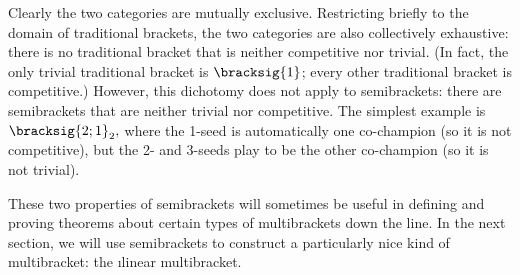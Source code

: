 {    Clearly the two categories are mutually exclusive. Restricting briefly to the domain of traditional brackets, the two categories are also collectively exhaustive: there is no traditional bracket that is neither competitive nor trivial. (In fact, the only trivial traditional bracket is $\bracksig{1}$; every other traditional bracket is competitive.) However, this dichotomy does not apply to semibrackets: there are semibrackets that are neither trivial nor competitive. The simplest example is $\bracksig{2;1}_2,$ where the 1-seed is automatically one co-champion (so it is not competitive), but the 2- and 3-seeds play to be the other co-champion (so it is not trivial).


    These two properties of semibrackets will sometimes be useful in defining and proving theorems about certain types of multibrackets down the line. In the next section, we will use semibrackets to construct a particularly nice kind of multibracket: the \i{linear multibracket.}
}